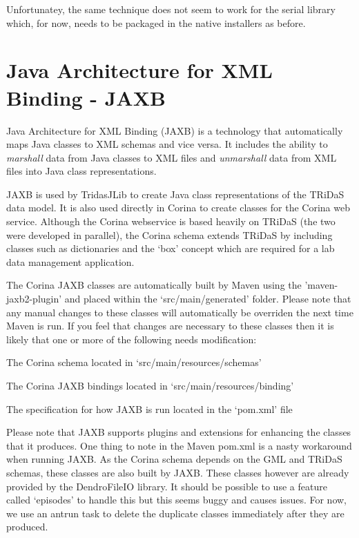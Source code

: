Unfortunatey, the same technique does not seem to work for the serial library which, for now, needs to be packaged in the native installers as before.  


\section{Java Architecture for XML Binding - JAXB}
\label{txt:jaxb}

Java Architecture for XML Binding (JAXB) is a technology that automatically maps Java classes to XML schemas and vice versa.  It includes the ability to \emph{marshall} data from Java classes to XML files and \emph{unmarshall} data from XML files into Java class representations.  

JAXB is used by TridasJLib to create Java class representations of the TRiDaS data model.  It is also used directly in Corina to create classes for the Corina web service.  Although the Corina webservice is based heavily on TRiDaS (the two were developed in parallel), the Corina schema extends TRiDaS by including classes such as dictionaries and the `box' concept which are required for a lab data management application.  

The Corina JAXB classes are automatically built by Maven using the 'maven-jaxb2-plugin' and placed within the `src/main/generated' folder.  Please note that any manual changes to these classes will automatically be overriden the next time Maven is run.  If you feel that changes are necessary to these classes then it is likely that one or more of the following needs modification:

\begin{itemize*}
 \item The Corina schema located in `src/main/resources/schemas'
 \item The Corina JAXB bindings located in `src/main/resources/binding'
 \item The specification for how JAXB is run located in the `pom.xml' file
\end{itemize*}

Please note that JAXB supports plugins and extensions for enhancing the classes that it produces.  One thing to note in the Maven pom.xml is a nasty workaround when running JAXB.  As the Corina schema depends on the GML and TRiDaS schemas, these classes are also built by JAXB.  These classes however are already provided by the DendroFileIO library.  It should be possible to use a feature called `episodes' to handle this but this seems buggy and causes issues.  For now, we use an antrun task to delete the duplicate classes immediately after they are produced.


